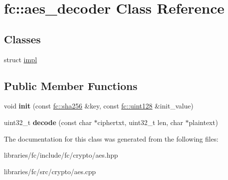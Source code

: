 \hypertarget{classfc_1_1aes__decoder}{}\section{fc\+:\+:aes\+\_\+decoder Class Reference}
\label{classfc_1_1aes__decoder}
\subsection*{Classes}
\begin{DoxyCompactItemize}
\item 
struct \mbox{\hyperlink{structfc_1_1aes__decoder_1_1impl}{impl}}
\end{DoxyCompactItemize}
\subsection*{Public Member Functions}
\begin{DoxyCompactItemize}
\item 
\mbox{\label{classfc_1_1aes__decoder_a5c7a4afa8000d639708a4956ae78fe35}} 
void {\bfseries init} (const \mbox{\hyperlink{classfc_1_1sha256}{fc\+::sha256}} \&key, const \mbox{\hyperlink{classfc_1_1uint128}{fc\+::uint128}} \&init\+\_\+value)
\item 
\mbox{\label{classfc_1_1aes__decoder_a5466676d345dbd29d90d9c8785bf93e8}} 
uint32\+\_\+t {\bfseries decode} (const char $\ast$ciphertxt, uint32\+\_\+t len, char $\ast$plaintext)
\end{DoxyCompactItemize}


The documentation for this class was generated from the following files\+:\begin{DoxyCompactItemize}
\item 
libraries/fc/include/fc/crypto/aes.\+hpp\item 
libraries/fc/src/crypto/aes.\+cpp\end{DoxyCompactItemize}
